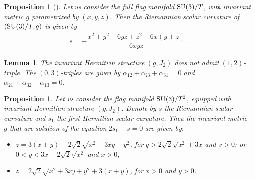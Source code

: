 \documentclass[10pt,a4paper]{amsart}
\numberwithin{equation}{section}
\newtheorem{Lemma}[Theorem]{Lemma}
\newtheorem{Proposition}[Theorem]{Proposition}
 { \theoremstyle{definition}
\newtheorem{Definition}[Theorem]{Definition}
\newtheorem{Question}[Theorem]{Question}
\newtheorem*{Notation}{Notation}
\newtheorem{Example}[Theorem]{Example}
\newtheorem{Remark}[Theorem]{Remark} }
\begin{document}
\begin{Proposition}[\cite{grego}]
Let us consider the full flag manifold ${\rm SU}(3)/T$, with invariant metric $g$ parametrized by $(x,y,z)$. Then the Riemannian scalar curvature of $({\rm SU}(3)/T,g)$ is given by
\begin{gather*}
s= -\dfrac{x^{2}+y^{2}-6yz+z^{2}-6x(y+z)}{6xyz}.
\end{gather*}
\end{Proposition}

\begin{Lemma}
The invariant Hermitian structure $(g, J_{2})$ does not admit $(1,2)$-triple. The $(0,3)$-triples are given by $\alpha_{12}+\alpha_{23}+\alpha_{31}=0$ and $\alpha_{21}+\alpha_{32}+\alpha_{13}=0$.
\end{Lemma}

\begin{Proposition} \label{curv-su3}
Let us consider the flag manifold ${\rm SU}(3)/T^2$, equipped with invariant Hermitian structure $(g, J_{2})$. Denote by $s$ the Riemannian scalar curvature and $s_1$ the first Hermitian scalar curvature. Then the invariant metric $g$ that are solution of the equation $2s_1-s=0$ are given by:
 \begin{itemize}\itemsep=0pt
\item[$(i)$] $z=3 (x+y)-2 \sqrt{2} \sqrt{x^2+3 x y+y^2}$, for $y>2 \sqrt{2} \sqrt{x^2}+3 x$ and $x>0$; or
$0<y<3 x-2 \sqrt{2} \sqrt{x^2}$ and $x>0$,
\item[$(ii)$] $z=2 \sqrt{2} \sqrt{x^2+3 x y+y^2}+3 (x+y)$, for $x>0$ and $y>0$.
\end{itemize}
\end{Proposition}
\end{document}
